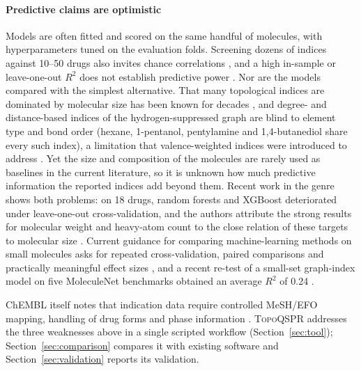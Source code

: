\documentclass[preprint,12pt]{elsarticle}
\newcommand{\ml}{\textsc{TopoQSPR}}
\begin{document}
\paragraph{Predictive claims are optimistic} Models are often fitted and scored on the same handful of molecules, with hyperparameters tuned on the evaluation folds. Screening dozens of indices against 10--50 drugs also invites chance correlations \cite{topliss1979chance}, and a high in-sample or leave-one-out $R^2$ does not establish predictive power \cite{golbraikh2002beware,alexander2015beware}. Nor are the models compared with the simplest alternative. That many topological indices are dominated by molecular size has been known for decades \cite{basak1987topological,rucker1999topological}, and degree- and distance-based indices of the hydrogen-suppressed graph are blind to element type and bond order (hexane, 1-pentanol, pentylamine and 1,4-butanediol share every such index), a limitation that valence-weighted indices were introduced to address \cite{kier1976molecular}. Yet the size and composition of the molecules are rarely used as baselines in the current literature, so it is unknown how much predictive information the reported indices add beyond them. Recent work in the genre shows both problems: on 18 drugs, random forests and XGBoost deteriorated under leave-one-out cross-validation, and the authors attribute the strong results for molecular weight and heavy-atom count to the close relation of these targets to molecular size \cite{colakoglu2026bipolar}. Current guidance for comparing machine-learning methods on small molecules asks for repeated cross-validation, paired comparisons and practically meaningful effect sizes \cite{ash2025protocols}, and a recent re-test of a small-set graph-index model on five MoleculeNet benchmarks obtained an average $R^2$ of 0.24 \cite{niane2026graph}.

ChEMBL itself notes that indication data require controlled MeSH/EFO mapping, handling of drug forms and phase information \cite{hunter2025chembl}. \ml{} addresses the three weaknesses above in a single scripted workflow (Section~\ref{sec:tool}); Section~\ref{sec:comparison} compares it with existing software and Section~\ref{sec:validation} reports its validation.
\end{document}
